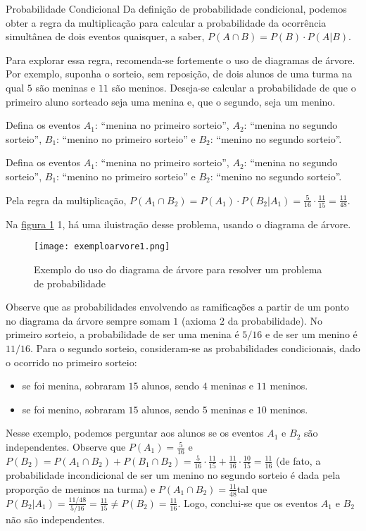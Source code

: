 \begin{paginatexto}{Probabilidade Condicional}
Da definição de probabilidade condicional, podemos obter a regra da multiplicação para calcular a probabilidade da ocorrência simultânea de dois eventos quaisquer, a saber, $P(A\cap B)=P(B)\cdot P(A|B)$.

Para explorar essa regra, recomenda-se fortemente o uso de diagramas de árvore. Por exemplo, suponha o sorteio, sem reposição, de dois alunos de uma turma na qual $5$ são meninas e $11$ são meninos. Deseja-se calcular a probabilidade de que o primeiro aluno sorteado seja uma menina e, que o segundo, seja um menino.

Defina os eventos $A_1$: “menina no primeiro sorteio”, $A_2$: “menina no segundo sorteio”, $B_1$: “menino no primeiro sorteio”{} e $B_2$: “menino no segundo sorteio”.

Defina os eventos $A_1$: “menina no primeiro sorteio”, $A_2$: “menina no segundo sorteio”, $B_1$: “menino no primeiro sorteio”{} e $B_2$: “menino no segundo sorteio”.

Pela regra da multiplicação, $P(A_1\cap B_2)=P(A_1)\cdot P(B_2|A_1)=\frac{5}{16}\cdot\frac{11}{15}=\frac{11}{48}$.

Na \hyperref[exemploarvore1]{figura \ref{exemploarvore1}} 1, há uma iluistração desse problema, usando o diagrama de árvore.
\begin{figure}[H]
\centering

\texttt{[image: exemploarvore1.png]}
\caption{Exemplo do uso do diagrama de árvore para resolver um problema de probabilidade}
\label{exemploarvore1}
\end{figure}

Observe que as probabilidades envolvendo as ramificações a partir de um ponto no diagrama da árvore sempre somam $1$ (axioma $2$ da probabilidade). No primeiro sorteio, a probabilidade de ser uma menina é $5/16$ e de ser um menino é $11/16$. Para o segundo sorteio, consideram-se as probabilidades condicionais, dado o ocorrido no primeiro sorteio:

\begin{itemize}
\item se foi menina, sobraram $15$ alunos, sendo $4$ meninas e $11$ meninos.
\item se foi menino, sobraram $15$ alunos, sendo $5$ meninas e $10$ meninos.
\end{itemize}

Nesse exemplo, podemos perguntar aos alunos se os eventos $A_1$ e $B_2$ são independentes. Observe que $P(A_1)=\frac{5}{16}$ e $P(B_2)=P(A_1\cap B_2)+P(B_1\cap B_2)=\frac{5}{16}\cdot \frac{11}{15}+\frac{11}{16}\cdot\frac{10}{15}=\frac{11}{16}$ (de fato, a probabilidade incondicional de ser um menino no segundo sorteio é dada pela proporção de meninos na turma) e $P(A_1\cap B_2)=\frac{11}{48} $tal que $P(B_2|A_1)=\frac{11/48}{5/16}=\frac{11}{15}\neq P(B_2)=\frac{11}{16}$. Logo, conclui-se que os eventos $A_1$ e $B_2$ não são independentes.


\end{paginatexto}
